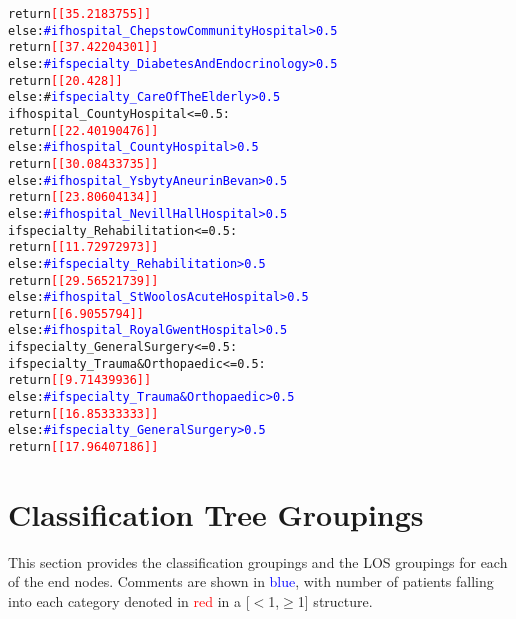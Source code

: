 \documentclass[thesis.tex]{subfiles}
\begin{document}
{\begin{alltt}
                                            return \textcolor{red}{[[35.2183755]]}
                                    else:  \textcolor{blue}{# if hospital_Chepstow Community Hospital > 0.5}
                                        return \textcolor{red}{[[37.42204301]]}
                            else:  \textcolor{blue}{# if specialty_Diabetes And Endocrinology > 0.5}
                                return \textcolor{red}{[[20.428]]}
                        else:  #\textcolor{blue}{ if specialty_Care Of The Elderly > 0.5}
                            if hospital_County Hospital <= 0.5:
                                return \textcolor{red}{[[22.40190476]]}
                            else:  \textcolor{blue}{# if hospital_County Hospital > 0.5}
                                return \textcolor{red}{[[30.08433735]]}
                    else:  \textcolor{blue}{# if hospital_Ysbyty Aneurin Bevan > 0.5}
                        return \textcolor{red}{[[23.80604134]]}
                else:  \textcolor{blue}{# if hospital_Nevill Hall Hospital > 0.5}
                    if specialty_Rehabilitation <= 0.5:
                        return \textcolor{red}{[[11.72972973]]}
                    else: \textcolor{blue}{# if specialty_Rehabilitation > 0.5}
                        return \textcolor{red}{[[29.56521739]]}
            else: \textcolor{blue}{# if hospital_St Woolos Acute Hospital > 0.5}
                return \textcolor{red}{[[6.9055794]]}
        else:  \textcolor{blue}{# if hospital_Royal Gwent Hospital > 0.5}
            if specialty_General Surgery <= 0.5:
                if specialty_Trauma & Orthopaedic <= 0.5:
                    return \textcolor{red}{[[9.71439936]]}
                else: \textcolor{blue}{# if specialty_Trauma & Orthopaedic > 0.5}
                    return \textcolor{red}{[[16.85333333]]}
            else:  \textcolor{blue}{# if specialty_General Surgery > 0.5}
                return \textcolor{red}{[[17.96407186]]}
\end{alltt}}

\section{Classification Tree Groupings}\label{app:secclassification}
\normalsize
This section provides the classification groupings and the LOS groupings for each of the end nodes. Comments are shown in \textcolor{blue}{blue}, with number of patients falling into each category denoted in \textcolor{red}{red} in a [$<$1,$\geq$1] structure. 
\end{document}
